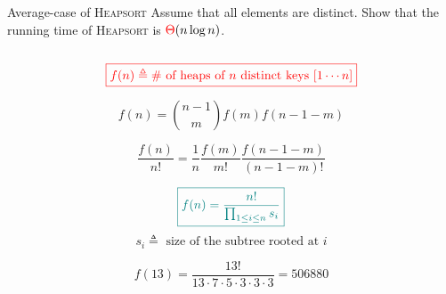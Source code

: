 \begin{frame}{}
  \begin{exampleblock}{Average-case of \textsc{Heapsort}}
    Assume that all elements are distinct. 
    Show that the  running time of \textsc{Heapsort} is $\textcolor{red}{\Theta}(n \log n)$.
  \end{exampleblock}

  \vspace{0.50cm}
  \begin{columns}
      \pause
      \pause
  \end{columns}
\end{frame}

\begin{frame}{}
  \centerline{}
  \begin{columns}
      \centerline{}
    \pause
      \centerline{}
  \end{columns}

  \vspace{0.50cm}
  \centerline{}
\end{frame}

\begin{frame}{}
  \[
    \textcolor{red}{\boxed{f(n) \triangleq \text{\# of heaps of } n \text{ distinct keys } [1 \cdots n]}}
  \]

  \pause
  \[
    f(n) = \binom{n-1}{m} f(m) f(n-1-m)
  \]

  \pause
  \vspace{0.50cm}
  \[
    \frac{f(n)}{n!} = \frac{1}{n} \frac{f(m)}{m!} \frac{f(n-1-m)}{(n-1-m)!}
  \]

  \pause
  \vspace{0.50cm}
  \[
    \textcolor{teal}{\boxed{f(n) = \frac{n!}{\prod_{1 \le i \le n} s_i}}}
  \]
  \[
    s_i \triangleq \text{ size of the subtree rooted at } i
  \]
\end{frame}

\begin{frame}{}

  \[
    f(13) = \frac{13!}{13 \cdot 7 \cdot 5 \cdot 3 \cdot 3 \cdot 3} = 506880
  \]
\end{frame}
